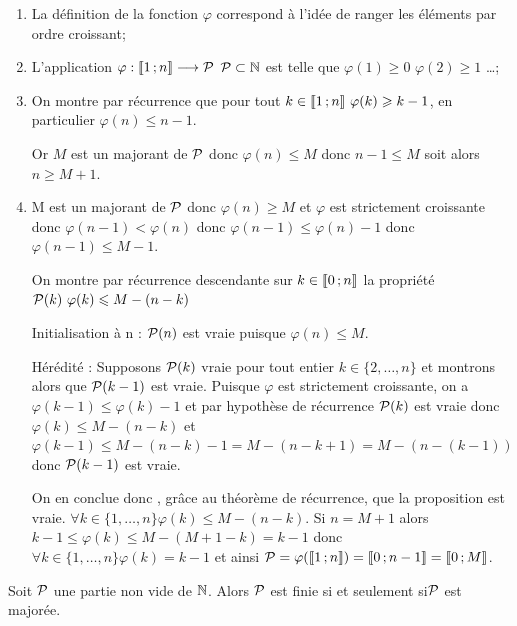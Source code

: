 \begin{enumerate}
  \item La définition de la fonction \(\varphi\) correspond à l'idée de 
    ranger les éléments par ordre croissant;
  \item L'application \(\fonctionR{\varphi}{\intervalleentier{1}{n}}{\P}\)
    \(\P \subset \N\) est telle que \(\varphi(1)\geqslant 0\) 
    \(\varphi(2)\geqslant 1\) \ldots;
  \item On montre par récurrence que pour tout \(k\in\intervalleentier{1}{n} 
    \ \varphi(k)\geqslant k - 1\), en particulier \(\varphi(n)\leqslant n - 1\). 

    Or \(M\) est un majorant de \(\P\) donc \(\varphi(n)\leqslant M\) donc 
    \(n - 1\leqslant M\) soit alors \(n\geqslant M + 1\).
  \item M est un majorant de \(\P\) donc \(\varphi(n)\geqslant M\) et 
    \(\varphi\) est strictement croissante donc \(\varphi(n - 1)<\varphi(n)\) 
    donc \(\varphi(n - 1)\leqslant\varphi(n)-1\) donc \(\varphi(n - 1)\leqslant 
    M - 1\). 

    On montre par récurrence descendante sur \(k\in\intervalleentier{0}{n}\) 
    la propriété \(\P(k) \ \varphi(k)\leqslant M - (n - k)\)

    Initialisation à n : \(\P(n)\) est vraie puisque \(\varphi(n)\leqslant 
    M\).

    Hérédité : Supposons \(\P(k)\) vraie pour tout entier \(k\in\{2, 
    \ldots, n\}\) et montrons alors que \(\P(k - 1)\) est vraie. Puisque 
    \(\varphi\) est strictement croissante, on a \(\varphi(k - 1)\leqslant 
    \varphi(k)-1\) et par hypothèse de récurrence \(\P(k)\) est vraie donc 
    \(\varphi(k)\leqslant M - (n - k)\) et \(\varphi(k - 1)\leqslant 
    M - (n - k)-1 = M - (n - k + 1)=M - (n - (k - 1))\) donc \(\P(k - 1)\) est vraie. 

    On en conclue donc , grâce au théorème de récurrence, que la proposition 
    est vraie. \(\forall k \in \{1, \ldots, n\} \varphi(k)\leqslant 
    M - (n - k)\). Si \(n = M + 1\) alors \(k - 1\leqslant \varphi(k)\leqslant M - 
    (M + 1 - k) = k - 1\) donc \(\forall k \in \{1, \ldots, n\} \varphi(k)=k - 1\) et 
    ainsi \(\P = \varphi(\intervalleentier{1}{n}) = \intervalleentier{0}{n - 1}= 
    \intervalleentier{0}{M}\).
\end{enumerate}

\begin{prop}
  Soit \(\P\) une partie non vide de \(\N\). Alors \(\P\) est finie si et 
  seulement si\(\P\) est majorée.
\end{prop}

